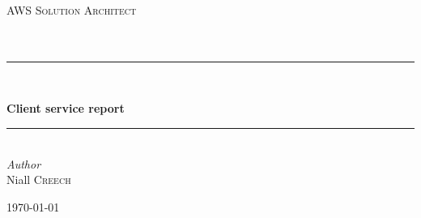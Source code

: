 

	
	
	\begin{titlepage} %
		\newcommand{\HRule}{\rule{\linewidth}{0.5mm}} %
		
		\center %
		
		
		\textsc{\LARGE AWS Solution Architect}\\[1.5cm] 
		
		\textsc{\Large }\\[0.5cm] %
		
		\textsc{\large }\\[0.5cm] %
		
		
		\HRule\\[0.4cm]
		

		\author{Niall Creech}
		{\huge\bfseries Client service report }\\[0.4cm] %
		
		\HRule\\[1.5cm]
		

		{\large\textit{Author}}\\
		Niall \textsc{Creech} %
		
		
		\vfill\vfill\vfill %
		
		{\large\today} %
		
		
		
		
		\vfill %
		
	\end{titlepage}
	

